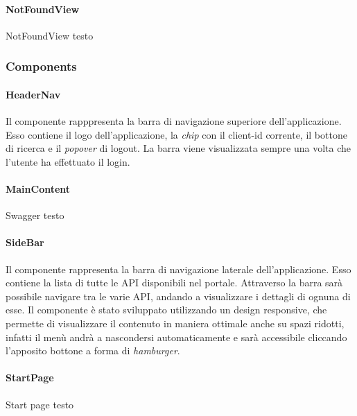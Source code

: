 \paragraph{NotFoundView}\label{par:not-found-view}
NotFoundView testo


\subsubsection{Components}\label{subsubsec:components}

\paragraph{HeaderNav}\label{par:header-nav}
Il componente rapppresenta la barra di navigazione superiore dell'applicazione. Esso contiene il logo dell'applicazione, la \textit{chip} con il client-id
corrente, il bottone di ricerca e il \textit{popover} di logout. 
La barra viene visualizzata sempre una volta che l'utente ha effettuato il login.\\

\paragraph{MainContent}\label{par:main-content}
Swagger testo

\paragraph{SideBar}\label{par:side-bar}
Il componente rappresenta la barra di navigazione laterale dell'applicazione. Esso contiene la lista di tutte le API disponibili nel portale.
Attraverso la barra sarà possibile navigare tra le varie API, andando a visualizzare i dettagli di ognuna di esse. 
Il componente è stato sviluppato utilizzando un design responsive, che permette di visualizzare il contenuto in maniera ottimale anche su spazi ridotti, 
infatti il menù andrà a nascondersi automaticamente e sarà accessibile cliccando l'apposito bottone a forma di \textit{hamburger}.\\


\paragraph{StartPage}\label{par:start-page}
Start page testo

